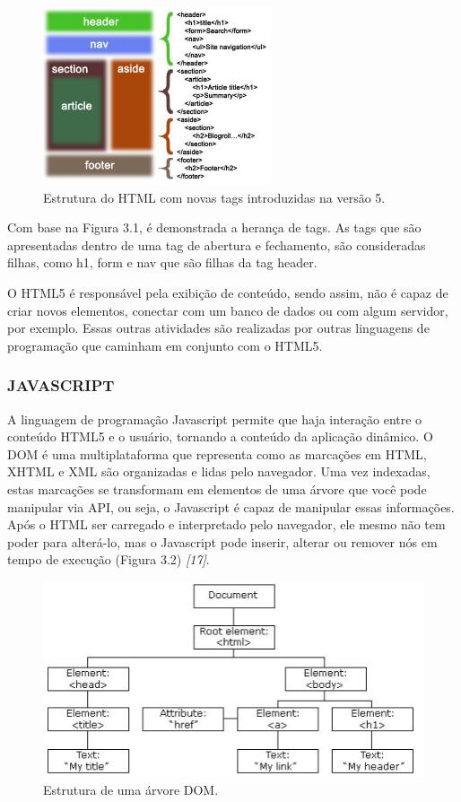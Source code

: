 \documentclass[
  12pt,				%
  openany,
  oneside,
  a4paper,			%
  english,			%
  brazil
]{article}
\numberwithin{figure}{section}
\numberwithin{table}{section}
\begin{document}
\begin{figure}[!htb]
\centering
\includegraphics[width=0.6\textwidth]{figura31}
\caption{Estrutura do HTML com novas tags introduzidas na versão 5.}
\end{figure}

Com base na Figura 3.1, é demonstrada a herança de tags. As tags que são apresentadas dentro de uma tag de abertura e fechamento, são consideradas filhas, como h1, form e nav que são filhas da tag header.

O HTML5 é responsável pela exibição de conteúdo, sendo assim, não é capaz de criar novos elementos, conectar com um banco de dados ou com algum servidor, por exemplo. Essas outras atividades são realizadas por outras linguagens de programação que caminham em conjunto com o HTML5.



\subsubsection{JAVASCRIPT}


A linguagem de programação Javascript permite que haja interação entre o conteúdo HTML5 e o usuário, tornando a conteúdo da aplicação dinâmico. O DOM é uma multiplataforma que representa como as marcações em HTML, XHTML e XML são organizadas e lidas pelo navegador. Uma vez indexadas, estas marcações se transformam em elementos de uma árvore que você pode manipular via API, ou seja, o Javascript é capaz de manipular essas informações. Após o HTML ser carregado e interpretado pelo navegador, ele mesmo não tem poder para alterá-lo, mas o Javascript pode inserir, alterar ou remover nós em tempo de execução (Figura 3.2) \textit{[17]}.

\begin{figure}[!htb]
\centering
\includegraphics[width=1\textwidth]{figura32}
\caption{Estrutura de uma árvore DOM.}
\end{figure}
\end{document}
